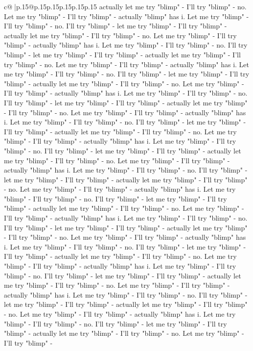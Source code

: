 \documentclass{article}
\begin{document}
{\begin{supertabular}{c@{$\;$}|p{.15\linewidth}@{}p{.15\linewidth}p{.15\linewidth}p{.15\linewidth}p{.15\linewidth}p{.15\linewidth}}
{{{actually let me try "blimp" {-} I'll try "blimp" {-} no. Let me try "blimp" {-} I'll try "blimp" {-} actually "blimp" has i. Let me try "blimp" {-} I'll try "blimp" {-} no. I'll try "blimp" {-} let me try "blimp" {-} I'll try "blimp" {-} actually let me try "blimp" {-} I'll try "blimp" {-} no. Let me try "blimp" {-} I'll try "blimp" {-} actually "blimp" has i. Let me try "blimp" {-} I'll try "blimp" {-} no. I'll try "blimp" {-} let me try "blimp" {-} I'll try "blimp" {-} actually let me try "blimp" {-} I'll try "blimp" {-} no. Let me try "blimp" {-} I'll try "blimp" {-} actually "blimp" has i. Let me try "blimp" {-} I'll try "blimp" {-} no. I'll try "blimp" {-} let me try "blimp" {-} I'll try "blimp" {-} actually let me try "blimp" {-} I'll try "blimp" {-} no. Let me try "blimp" {-} I'll try "blimp" {-} actually "blimp" has i. Let me try "blimp" {-} I'll try "blimp" {-} no. I'll try "blimp" {-} let me try "blimp" {-} I'll try "blimp" {-} actually let me try "blimp" {-} I'll try "blimp" {-} no. Let me try "blimp" {-} I'll try "blimp" {-} actually "blimp" has i. Let me try "blimp" {-} I'll try "blimp" {-} no. I'll try "blimp" {-} let me try "blimp" {-} I'll try "blimp" {-} actually let me try "blimp" {-} I'll try "blimp" {-} no. Let me try "blimp" {-} I'll try "blimp" {-} actually "blimp" has i. Let me try "blimp" {-} I'll try "blimp" {-} no. I'll try "blimp" {-} let me try "blimp" {-} I'll try "blimp" {-} actually let me try "blimp" {-} I'll try "blimp" {-} no. Let me try "blimp" {-} I'll try "blimp" {-} actually "blimp" has i. Let me try "blimp" {-} I'll try "blimp" {-} no. I'll try "blimp" {-} let me try "blimp" {-} I'll try "blimp" {-} actually let me try "blimp" {-} I'll try "blimp" {-} no. Let me try "blimp" {-} I'll try "blimp" {-} actually "blimp" has i. Let me try "blimp" {-} I'll try "blimp" {-} no. I'll try "blimp" {-} let me try "blimp" {-} I'll try "blimp" {-} actually let me try "blimp" {-} I'll try "blimp" {-} no. Let me try "blimp" {-} I'll try "blimp" {-} actually "blimp" has i. Let me try "blimp" {-} I'll try "blimp" {-} no. I'll try "blimp" {-} let me try "blimp" {-} I'll try "blimp" {-} actually let me try "blimp" {-} I'll try "blimp" {-} no. Let me try "blimp" {-} I'll try "blimp" {-} actually "blimp" has i. Let me try "blimp" {-} I'll try "blimp" {-} no. I'll try "blimp" {-} let me try "blimp" {-} I'll try "blimp" {-} actually let me try "blimp" {-} I'll try "blimp" {-} no. Let me try "blimp" {-} I'll try "blimp" {-} actually "blimp" has i. Let me try "blimp" {-} I'll try "blimp" {-} no. I'll try "blimp" {-} let me try "blimp" {-} I'll try "blimp" {-} actually let me try "blimp" {-} I'll try "blimp" {-} no. Let me try "blimp" {-} I'll try "blimp" {-} actually "blimp" has i. Let me try "blimp" {-} I'll try "blimp" {-} no. I'll try "blimp" {-} let me try "blimp" {-} I'll try "blimp" {-} actually let me try "blimp" {-} I'll try "blimp" {-} no. Let me try "blimp" {-} I'll try "blimp" {-} actually "blimp" has i. Let me try "blimp" {-} I'll try "blimp" {-} no. I'll try "blimp" {-} let me try "blimp" {-} I'll try "blimp" {-} actually let me try "blimp" {-} I'll try "blimp" {-} no. Let me try "blimp" {-} I'll try "blimp" {-} }}}
\end{supertabular}}
\end{document}
